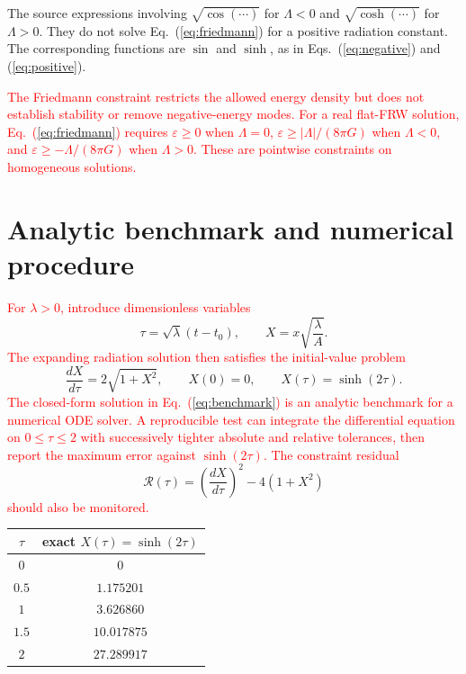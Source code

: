 \documentclass[prd,reprint,eqsecnum,nofootinbib]{revtex4-1}
\newcommand{\science}[1]{\textcolor{red}{#1}}
\newcommand{\cut}[1]{\textcolor{green!45!black}{#1}}
\begin{document}
\cut{The source expressions involving $\sqrt{\cos(\cdots)}$ for $\Lambda<0$ and $\sqrt{\cosh(\cdots)}$ for $\Lambda>0$. They do not solve Eq.~(\ref{eq:friedmann}) for a positive radiation constant. The corresponding functions are $\sin$ and $\sinh$, as in Eqs.~(\ref{eq:negative}) and (\ref{eq:positive}).}

\science{The Friedmann constraint restricts the allowed energy density but does not establish stability or remove negative-energy modes. For a real flat-FRW solution, Eq.~(\ref{eq:friedmann}) requires
$\varepsilon\geq 0$ when $\Lambda=0$,
$\varepsilon\geq |\Lambda|/(8\pi G)$ when $\Lambda<0$, and
$\varepsilon\geq-\Lambda/(8\pi G)$ when $\Lambda>0$. These are pointwise constraints on homogeneous solutions.}

\section{Analytic benchmark and numerical procedure}

\science{For $\lambda>0$, introduce dimensionless variables}
\begin{equation}
  \tau=\sqrt{\lambda}(t-t_0),
  \qquad
  X=x\sqrt{\frac{\lambda}{A}}.
\end{equation}
\science{The expanding radiation solution then satisfies the initial-value problem}
\begin{equation}
  \frac{dX}{d\tau}=2\sqrt{1+X^2},
  \qquad X(0)=0,
  \qquad X(\tau)=\sinh(2\tau).
  \label{eq:benchmark}
\end{equation}
\science{The closed-form solution in Eq.~(\ref{eq:benchmark}) is an analytic benchmark for a numerical ODE solver. A reproducible test can integrate the differential equation on $0\leq\tau\leq2$ with successively tighter absolute and relative tolerances, then report the maximum error against $\sinh(2\tau)$. The constraint residual}
\begin{equation}
  \mathcal R(\tau)=
  \left(\frac{dX}{d\tau}\right)^2-4(1+X^2)
\end{equation}
\science{should also be monitored.}

\begin{center}
\begin{tabular}{c|c}
$\tau$ & exact $X(\tau)=\sinh(2\tau)$\\
\hline
$0$   & $0$\\
$0.5$ & $1.175201$\\
$1$   & $3.626860$\\
$1.5$ & $10.017875$\\
$2$   & $27.289917$
\end{tabular}
\end{center}
\end{document}
